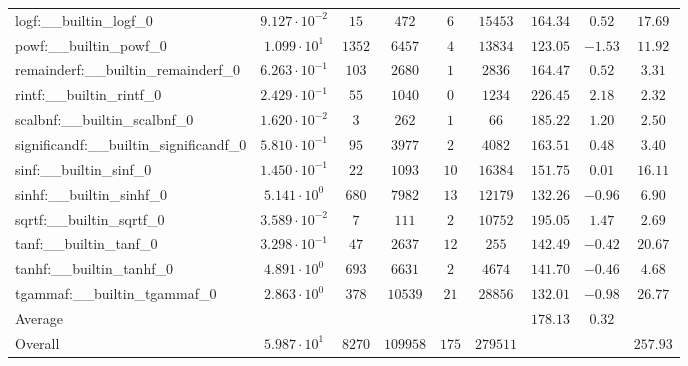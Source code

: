 \begin{tabular}{|l|c|c|c|c|c|c|c|c|}
logf:\_\_builtin\_logf\_0                 & $ 9.127 \cdot 10^{-2} $ & $ 15     $ & $ 472    $ & $ 6   $ & $ 15453  $ & $ 164.34      $ & $ 0.52    $ & $ 17.69   $ \\
powf:\_\_builtin\_powf\_0                 & $ 1.099 \cdot 10^{1}  $ & $ 1352   $ & $ 6457   $ & $ 4   $ & $ 13834  $ & $ 123.05      $ & $ -1.53   $ & $ 11.92   $ \\
remainderf:\_\_builtin\_remainderf\_0     & $ 6.263 \cdot 10^{-1} $ & $ 103    $ & $ 2680   $ & $ 1   $ & $ 2836   $ & $ 164.47      $ & $ 0.52    $ & $ 3.31    $ \\
rintf:\_\_builtin\_rintf\_0               & $ 2.429 \cdot 10^{-1} $ & $ 55     $ & $ 1040   $ & $ 0   $ & $ 1234   $ & $ 226.45      $ & $ 2.18    $ & $ 2.32    $ \\
scalbnf:\_\_builtin\_scalbnf\_0           & $ 1.620 \cdot 10^{-2} $ & $ 3      $ & $ 262    $ & $ 1   $ & $ 66     $ & $ 185.22      $ & $ 1.20    $ & $ 2.50    $ \\
significandf:\_\_builtin\_significandf\_0 & $ 5.810 \cdot 10^{-1} $ & $ 95     $ & $ 3977   $ & $ 2   $ & $ 4082   $ & $ 163.51      $ & $ 0.48    $ & $ 3.40    $ \\
sinf:\_\_builtin\_sinf\_0                 & $ 1.450 \cdot 10^{-1} $ & $ 22     $ & $ 1093   $ & $ 10  $ & $ 16384  $ & $ 151.75      $ & $ 0.01    $ & $ 16.11   $ \\
sinhf:\_\_builtin\_sinhf\_0               & $ 5.141 \cdot 10^{0}  $ & $ 680    $ & $ 7982   $ & $ 13  $ & $ 12179  $ & $ 132.26      $ & $ -0.96   $ & $ 6.90    $ \\
sqrtf:\_\_builtin\_sqrtf\_0               & $ 3.589 \cdot 10^{-2} $ & $ 7      $ & $ 111    $ & $ 2   $ & $ 10752  $ & $ 195.05      $ & $ 1.47    $ & $ 2.69    $ \\
tanf:\_\_builtin\_tanf\_0                 & $ 3.298 \cdot 10^{-1} $ & $ 47     $ & $ 2637   $ & $ 12  $ & $ 255    $ & $ 142.49      $ & $ -0.42   $ & $ 20.67   $ \\
tanhf:\_\_builtin\_tanhf\_0               & $ 4.891 \cdot 10^{0}  $ & $ 693    $ & $ 6631   $ & $ 2   $ & $ 4674   $ & $ 141.70      $ & $ -0.46   $ & $ 4.68    $ \\
tgammaf:\_\_builtin\_tgammaf\_0           & $ 2.863 \cdot 10^{0}  $ & $ 378    $ & $ 10539  $ & $ 21  $ & $ 28856  $ & $ 132.01      $ & $ -0.98   $ & $ 26.77   $ \\
\hline
Average                                   & $                     $ & $        $ & $        $ & $     $ & $        $ & $ 178.13      $ & $ 0.32    $ & $         $ \\
\hline
Overall                                   & $ 5.987 \cdot 10^{1}  $ & $ 8270   $ & $ 109958 $ & $ 175 $ & $ 279511 $ & $             $ & $         $ & $ 257.93  $ \\
\hline
\end{tabular}
